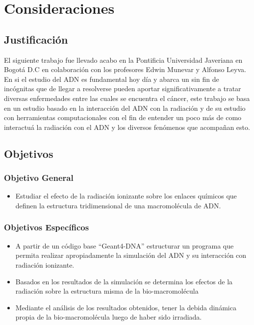\clearpage
\section{Consideraciones}

\subsection{Justificación}
\label{sec:Intro}
El siguiente trabajo fue llevado acabo en la Pontificia Universidad Javeriana en Bogotá D.C en colaboración con los profesores Edwin Munevar y Alfonso Leyva. En si el estudio del ADN es fundamental hoy día y abarca un sin fin de incógnitas que de llegar a resolverse pueden aportar significativamente a tratar diversas enfermedades entre las cuales se encuentra el cáncer, este trabajo se basa en un estudio basado en la interacción del ADN con la radiación y de su estudio con herramientas computacionales con el fin de entender un poco más de como interactuá la radiación con el ADN y los diversos fenómenos que acompañan esto.
\subsection{Objetivos}
\subsubsection{Objetivo General}
\begin{itemize}
  \item Estudiar el efecto de la radiación ionizante sobre los enlaces químicos que definen la estructura tridimensional de una macromolécula de ADN.
\end{itemize}
\subsubsection{Objetivos Específicos}
\begin{itemize}
  \item A partir de un código base “Geant4-DNA” estructurar un programa que permita realizar apropiadamente la simulación del ADN y su interacción con radiación ionizante.
  \item Basados en los resultados de la simulación se determina los efectos de la radiación sobre la estructura misma de la bio-macromolécula
  \item Mediante el análisis de los resultados obtenidos, tener la debida dinámica propia de la bio-macromolécula luego de haber sido irradiada.
\end{itemize}
